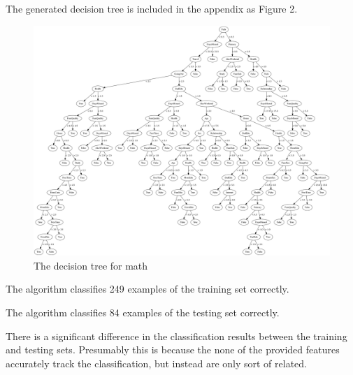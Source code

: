 \documentclass[12pt]{article}
\begin{document}
\problemsub
The generated decision tree is included in the appendix as Figure 2.
\begin{figure}
  \caption{The decision tree for math}
  \centering
  \includegraphics[width=\textwidth]{math-graph.png}
\end{figure}

\problemsub
The algorithm classifies 249 examples of the training set correctly.

\problemsub
The algorithm classifies 84 examples of the testing set correctly.

\problemsub
There is a significant difference in the classification results between the training and testing sets. Presumably this
is because the none of the provided features accurately track the classification, but instead are only sort of related.
\end{document}
